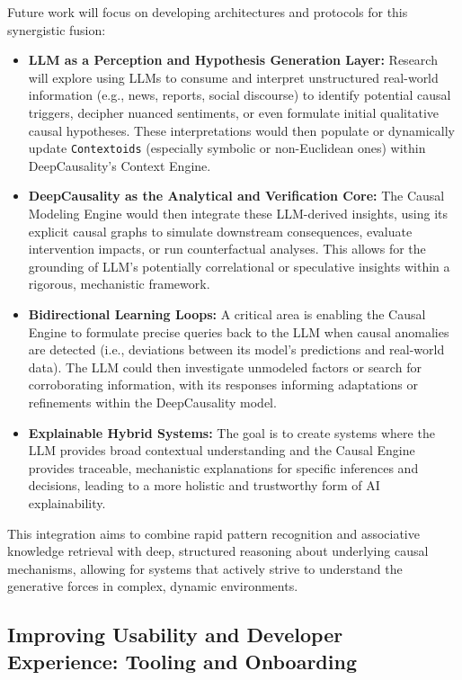 Future work will focus on developing architectures and protocols for this synergistic fusion:
\begin{itemize}
    \item \textbf{LLM as a Perception and Hypothesis Generation Layer:} Research will explore using LLMs to consume and interpret unstructured real-world information (e.g., news, reports, social discourse) to identify potential causal triggers, decipher nuanced sentiments, or even formulate initial qualitative causal hypotheses. These interpretations would then populate or dynamically update \texttt{Contextoids} (especially symbolic or non-Euclidean ones) within DeepCausality's Context Engine.
    \item \textbf{DeepCausality as the Analytical and Verification Core:} The Causal Modeling Engine would then integrate these LLM-derived insights, using its explicit causal graphs to simulate downstream consequences, evaluate intervention impacts, or run counterfactual analyses. This allows for the grounding of LLM's potentially correlational or speculative insights within a rigorous, mechanistic framework.
    \item \textbf{Bidirectional Learning Loops:} A critical area is enabling the Causal Engine to formulate precise queries back to the LLM when causal anomalies are detected (i.e., deviations between its model's predictions and real-world data). The LLM could then investigate unmodeled factors or search for corroborating information, with its responses informing adaptations or refinements within the DeepCausality model.
    \item \textbf{Explainable Hybrid Systems:} The goal is to create systems where the LLM provides broad contextual understanding and the Causal Engine provides traceable, mechanistic explanations for specific inferences and decisions, leading to a more holistic and trustworthy form of AI explainability.
\end{itemize}
This integration aims to combine rapid pattern recognition and associative knowledge retrieval with deep, structured reasoning about underlying causal mechanisms, allowing for systems that actively strive to understand the generative forces in complex, dynamic environments.

\subsection{Improving Usability and Developer Experience: Tooling and Onboarding}
\label{subsec:tooling_onboarding}


